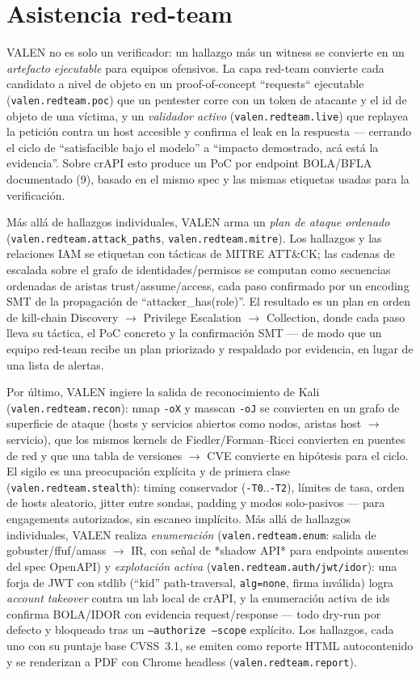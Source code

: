 \documentclass[11pt]{article}
\begin{document}
\section{Asistencia red-team}
VALEN no es solo un verificador: un hallazgo más un witness se convierte en un
\emph{artefacto ejecutable} para equipos ofensivos. La capa red-team convierte
cada candidato a nivel de objeto en un proof-of-concept ``requests`` ejecutable
(\texttt{valen.redteam.poc}) que un pentester corre con un token de atacante y el
id de objeto de una víctima, y un \emph{validador activo}
(\texttt{valen.redteam.live}) que replayea la petición contra un host accesible y
confirma el leak en la respuesta --- cerrando el ciclo de ``satisfacible bajo el
modelo'' a ``impacto demostrado, acá está la evidencia''. Sobre crAPI esto
produce un PoC por endpoint BOLA/BFLA documentado (9), basado en el mismo spec y
las mismas etiquetas usadas para la verificación.

Más allá de hallazgos individuales, VALEN arma un \emph{plan de ataque ordenado}
(\texttt{valen.redteam.attack\_paths}, \texttt{valen.redteam.mitre}). Los
hallazgos y las relaciones IAM se etiquetan con tácticas de MITRE ATT\&CK; las
cadenas de escalada sobre el grafo de identidades/permisos se computan como
secuencias ordenadas de aristas trust/assume/access, cada paso confirmado por un
encoding SMT de la propagación de ``attacker\_has(role)''. El resultado es un
plan en orden de kill-chain Discovery $\to$ Privilege Escalation $\to$
Collection, donde cada paso lleva su táctica, el PoC concreto y la confirmación
SMT --- de modo que un equipo red-team recibe un plan priorizado y respaldado por
evidencia, en lugar de una lista de alertas.

Por último, VALEN ingiere la salida de reconocimiento de Kali
(\texttt{valen.redteam.recon}): nmap \texttt{-oX} y masscan \texttt{-oJ} se
convierten en un grafo de superficie de ataque (hosts y servicios abiertos como
nodos, aristas host $\to$ servicio), que los mismos kernels de
Fiedler/Forman--Ricci convierten en puentes de red y que una tabla de versiones
$\to$ CVE convierte en hipótesis para el ciclo. El sigilo es una preocupación
explícita y de primera clase (\texttt{valen.redteam.stealth}): timing
conservador (\texttt{-T0}..\texttt{-T2}), límites de tasa, orden de hosts
aleatorio, jitter entre sondas, padding y modos solo-pasivos --- para engagements
autorizados, sin escaneo implícito. Más allá de hallazgos individuales, VALEN
realiza \emph{enumeración} (\texttt{valen.redteam.enum}: salida de
gobuster/ffuf/amass $\to$ IR, con señal de *shadow API* para endpoints ausentes
del spec OpenAPI) y \emph{explotación activa}
(\texttt{valen.redteam.auth/jwt/idor}): una forja de JWT con stdlib (``kid''
path-traversal, \texttt{alg=none}, firma inválida) logra \emph{account takeover}
contra un lab local de crAPI, y la enumeración activa de ids confirma BOLA/IDOR
con evidencia request/response --- todo dry-run por defecto y bloqueado tras un
\texttt{--authorize --scope} explícito. Los hallazgos, cada uno con su puntaje
base CVSS~3.1, se emiten como reporte HTML autocontenido y se renderizan a PDF
con Chrome headless (\texttt{valen.redteam.report}).
\end{document}
